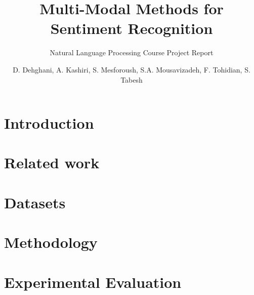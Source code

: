 \documentclass[sigconf]{acmart}
\begin{document}
%

\title{Multi-Modal Methods for Sentiment Recognition}
\subtitle{Natural Language Processing Course Project Report}
\author{D. Dehghani, A. Kashiri, S. Mesforoush, S.A. Mousavizadeh, F. Tohidian, S. Tabesh}


\begin{abstract}

\end{abstract}


\maketitle



\section{Introduction}
\label{sec:introduction}


\section{Related work}
\label{sec:literature}


\section{Datasets}
\label{sec:datasets} 


\section{Methodology}
\label{sec:method}

%
\section{Experimental Evaluation}
\label{sec:evaluation}

%
\end{document}

